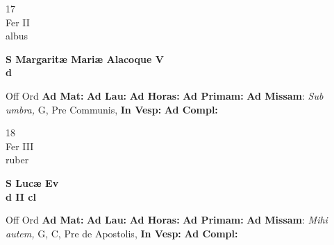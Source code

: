 \documentclass[10pt, openany]{book}
\begin{document}
        \begin{center}
            \begin{minipage}{3.5in}
                \vspace{2em}
                \begin{minipage}{0.5in}
                    {\Huge 17} \\
                    {\normalsize Fer II} \\
                    {\normalsize albus}
                \end{minipage}
                \begin{minipage}{3.0in}
                    \textbf{ \large S Margaritæ Mariæ Alacoque V \\
                    \textnormal{\normalsize d}} \\ 
                \end{minipage}
                \begin{justify}Off Ord
                    \textbf{Ad Mat: }
                    \textbf{Ad Lau: }
                    \textbf{Ad Horas: }
                    \textbf{Ad Primam: }\textbf{Ad Missam}: \textit{Sub umbra,} G, Pre Communis,  
                    \textbf{In Vesp: }
                    \textbf{Ad Compl: }
                \end{justify}
            \end{minipage}
        \end{center}
    
        \begin{center}
            \begin{minipage}{3.5in}
                \vspace{2em}
                \begin{minipage}{0.5in}
                    {\Huge 18} \\
                    {\normalsize Fer III} \\
                    {\normalsize ruber}
                \end{minipage}
                \begin{minipage}{3.0in}
                    \textbf{ \large S Lucæ Ev \\
                    \textnormal{\normalsize d II cl}} \\ 
                \end{minipage}
                \begin{justify}Off Ord
                    \textbf{Ad Mat: }
                    \textbf{Ad Lau: }
                    \textbf{Ad Horas: }
                    \textbf{Ad Primam: }\textbf{Ad Missam}: \textit{Mihi autem,} G, C, Pre de Apostolis,  
                    \textbf{In Vesp: }
                    \textbf{Ad Compl: }
                \end{justify}
            \end{minipage}
        \end{center}
    
\end{document}
